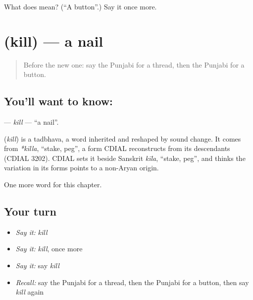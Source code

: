 \begin{tcolorbox}[breakable,colback=teal!4,colframe=teal!35!black,title={Before you move on}]
What does  mean? (\textquotedblleft{}A button\textquotedblright{}.) Say it once more.
\end{tcolorbox}
\section[\texorpdfstring{\pa{ਕਿੱਲ} (kill)}{ਕਿੱਲ (kill)}]{ (kill) — a nail}

\label{lesson:PA-C116-kill}



\begin{quote}
Before the new one: say the Punjabi for a thread, then the Punjabi for a button.
\end{quote}

\subsection*{You'll want to know: }
\textbf{} — \emph{kill} — \textquotedblleft{}a nail\textquotedblright{}.

\begin{cousinweb}
\textbf{} (\emph{kill}) is a tadbhava, a word inherited and reshaped by sound change. It comes from \emph{*kīlla}, \textquotedblleft{}stake, peg\textquotedblright{}, a form CDIAL reconstructs from its descendants (CDIAL 3202). CDIAL sets it beside Sanskrit \emph{kīla}, \textquotedblleft{}stake, peg\textquotedblright{}, and thinks the variation in its forms points to a non-Aryan origin.
\end{cousinweb}

\begin{grammarlens}[title={What you've built}]
One more word for this chapter.
\end{grammarlens}

\subsection*{Your turn}
\begin{itemize}
\raggedright
  \item \emph{Say it:} \emph{kill}
  \item \emph{Say it:} \emph{kill}, once more
  \item \emph{Say it:} say \emph{kill}
  \item \emph{Recall:} say the Punjabi for a thread, then the Punjabi for a button, then say \emph{kill} again
\end{itemize}

